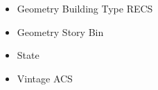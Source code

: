 \begin{itemize}
\item Geometry Building Type RECS
\item Geometry Story Bin
\item State
\item Vintage ACS
\end{itemize}
